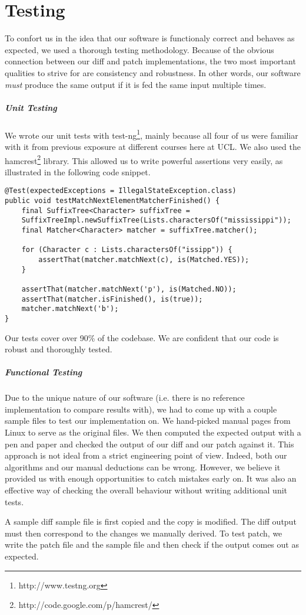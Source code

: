 \chapter{Testing}

To confort us in the idea that our software is functionaly correct and behaves as expected, we used a thorough testing methodology. Because of the obvious connection between our diff and patch implementations, the two most important qualities to strive for are consistency and robustness. In other words, our software \textit{must} produce the same output if it is fed the same input multiple times.
\paragraph{Unit Testing}

We wrote our unit tests with test-ng\footnote{http://www.testng.org}, mainly because all four of us were familiar with it from previous exposure at different courses here at UCL. We also used the hamcrest\footnote{http://code.google.com/p/hamcrest/} library. This allowed us to write powerful assertions very easily, as illustrated in the following code snippet.

\begin{lstlisting}
@Test(expectedExceptions = IllegalStateException.class)
public void testMatchNextElementMatcherFinished() {
    final SuffixTree<Character> suffixTree = 
    SuffixTreeImpl.newSuffixTree(Lists.charactersOf("mississippi"));
    final Matcher<Character> matcher = suffixTree.matcher();

    for (Character c : Lists.charactersOf("issipp")) {
        assertThat(matcher.matchNext(c), is(Matched.YES));
    }

    assertThat(matcher.matchNext('p'), is(Matched.NO));
    assertThat(matcher.isFinished(), is(true));
    matcher.matchNext('b');
}
\end{lstlisting}

Our tests cover over 90\% of the codebase. We are confident that our code is robust and thoroughly tested.

\paragraph{Functional Testing}
Due to the unique nature of our software (i.e. there is no reference implementation to compare results with), we had to come up with a couple sample files to test our implementation on. We hand-picked manual pages from Linux to serve as the original files. We then computed the expected output with a pen and paper and checked the output of our diff and our patch against it. This approach is not ideal from a strict engineering point of view. Indeed, both our algorithms and our manual deductions can be wrong. However, we believe it provided us with enough opportunities to catch mistakes early on. It was also an effective way of checking the overall behaviour without writing additional unit tests.

A sample diff sample file is first copied and the copy is modified. The diff output must then correspond to the changes we manually derived. To test patch, we write the patch file and the sample file and then check if the output comes out as expected.
